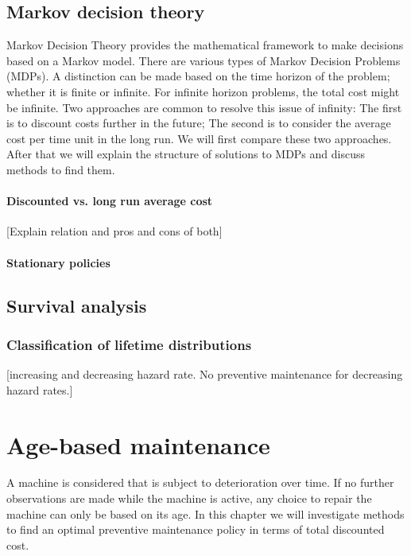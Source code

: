 \section{Markov decision theory}
Markov Decision Theory provides the mathematical framework to make decisions based on a Markov model.
There are various types of Markov Decision Problems (MDPs).
A distinction can be made based on the time horizon of the problem; whether it is finite or infinite.
For infinite horizon problems, the total cost might be infinite.
Two approaches are common to resolve this issue of infinity: The first is to discount costs further in the future; The second is to consider the average cost per time unit in the long run.
We will first compare these two approaches.
After that we will explain the structure of solutions to MDPs and discuss methods to find them.
\subsubsection{Discounted vs. long run average cost}
[Explain relation and pros and cons of both]
\subsubsection{Stationary policies}
\section{Survival analysis}
\subsection{Classification of lifetime distributions}
[increasing and decreasing hazard rate. No preventive maintenance for decreasing hazard rates.]


\chapter{Age-based maintenance}\label{chapter:AgeBased}
A machine is considered that is subject to deterioration over time.
If no further observations are made while the machine is active, any choice to repair the machine can only be based on its age.
In this chapter we will investigate methods to find an optimal preventive maintenance policy in terms of total discounted cost.







